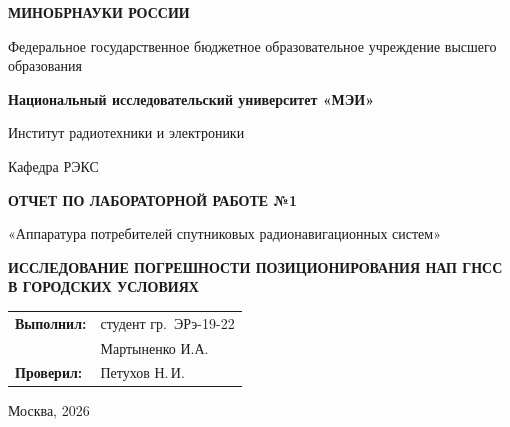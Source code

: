 \begin{titlepage}
    \centering
    {\bfseries МИНОБРНАУКИ РОССИИ\par}
    Федеральное государственное бюджетное образовательное учреждение высшего образования \\
    {\bfseries Национальный исследовательский университет «МЭИ»\par}
    \vspace{1cm}
    Институт радиотехники и электроники\par
    Кафедра РЭКС\par
    \vspace{3cm}
    
    {\bfseries\large ОТЧЕТ ПО ЛАБОРАТОРНОЙ РАБОТЕ №1\par}
    \vspace{0.5cm}
    {\large «Аппаратура потребителей спутниковых радионавигационных систем»\par}
    {\bfseries ИССЛЕДОВАНИЕ ПОГРЕШНОСТИ ПОЗИЦИОНИРОВАНИЯ НАП ГНСС В ГОРОДСКИХ УСЛОВИЯХ\par}
    
    \vspace{3.5cm}
 \vspace{1.5cm}
\noindent\hfill
\begin{tabular}{@{}ll@{}}
    \textbf{Выполнил:} & студент гр.~ЭРэ-19-22 \\
                        & Мартыненко И.А. \\[0.4cm]
    \textbf{Проверил:}  & Петухов Н.\,И.\\[0.4cm]
\end{tabular}   
    \vfill
    {Москва, 2026}
\end{titlepage}


